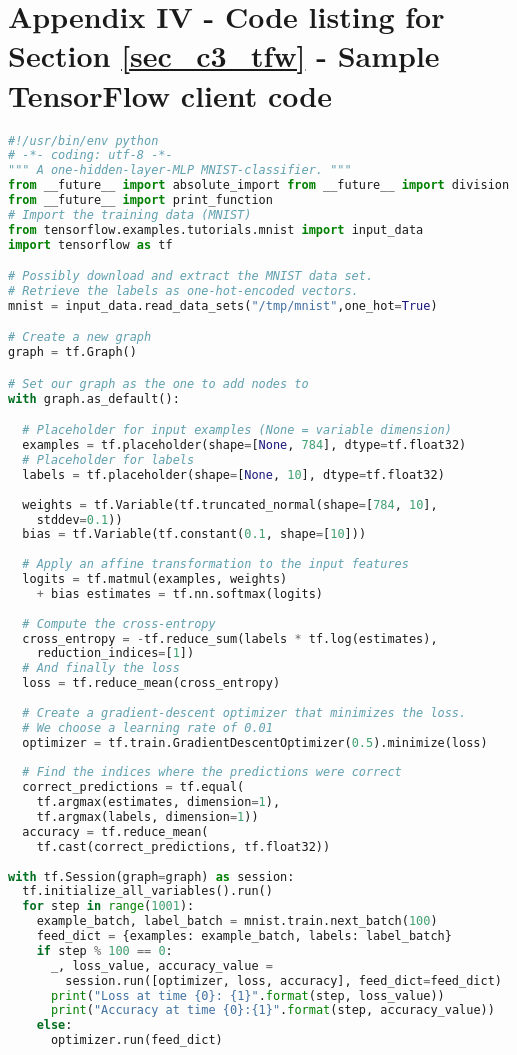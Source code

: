 
\section*{Appendix IV - Code listing for Section \ref{sec_c3_tfw} - Sample TensorFlow client code}
\begin{lstlisting}[language=Python]
#!/usr/bin/env python
# -*- coding: utf-8 -*-
""" A one-hidden-layer-MLP MNIST-classifier. """
from __future__ import absolute_import from __future__ import division
from __future__ import print_function
# Import the training data (MNIST)
from tensorflow.examples.tutorials.mnist import input_data
import tensorflow as tf

# Possibly download and extract the MNIST data set. 
# Retrieve the labels as one-hot-encoded vectors. 
mnist = input_data.read_data_sets("/tmp/mnist",one_hot=True)

# Create a new graph
graph = tf.Graph()

# Set our graph as the one to add nodes to
with graph.as_default():

  # Placeholder for input examples (None = variable dimension)
  examples = tf.placeholder(shape=[None, 784], dtype=tf.float32)
  # Placeholder for labels
  labels = tf.placeholder(shape=[None, 10], dtype=tf.float32)
  
  weights = tf.Variable(tf.truncated_normal(shape=[784, 10],
    stddev=0.1))
  bias = tf.Variable(tf.constant(0.1, shape=[10]))
  
  # Apply an affine transformation to the input features
  logits = tf.matmul(examples, weights) 
    + bias estimates = tf.nn.softmax(logits)
  
  # Compute the cross-entropy
  cross_entropy = -tf.reduce_sum(labels * tf.log(estimates),
    reduction_indices=[1]) 
  # And finally the loss
  loss = tf.reduce_mean(cross_entropy)
  
  # Create a gradient-descent optimizer that minimizes the loss.
  # We choose a learning rate of 0.01
  optimizer = tf.train.GradientDescentOptimizer(0.5).minimize(loss)
  
  # Find the indices where the predictions were correct
  correct_predictions = tf.equal( 
    tf.argmax(estimates, dimension=1), 
    tf.argmax(labels, dimension=1))
  accuracy = tf.reduce_mean(
    tf.cast(correct_predictions, tf.float32))
    
with tf.Session(graph=graph) as session: 
  tf.initialize_all_variables().run() 
  for step in range(1001):
    example_batch, label_batch = mnist.train.next_batch(100)
    feed_dict = {examples: example_batch, labels: label_batch}
    if step % 100 == 0:
      _, loss_value, accuracy_value =
        session.run([optimizer, loss, accuracy], feed_dict=feed_dict)
      print("Loss at time {0}: {1}".format(step, loss_value))
      print("Accuracy at time {0}:{1}".format(step, accuracy_value))
    else:
      optimizer.run(feed_dict)
\end{lstlisting}